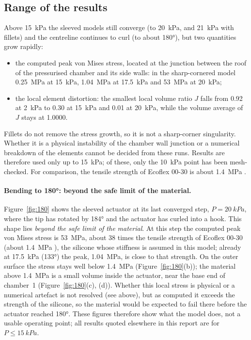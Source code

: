 \documentclass[12pt,a4paper,oneside]{report}
\numberwithin{equation}{chapter}
\numberwithin{figure}{chapter}
\numberwithin{table}{chapter}
\begin{document}
\subsection{Range of the results}\label{sec:limit}
Above \SI{15}{kPa} the sleeved models still converge (to \SI{20}{kPa}, and \SI{21}{kPa} with fillets) and the
centreline continues to curl (to about \ang{180}), but two quantities grow rapidly:
\begin{itemize}
\item the computed peak von Mises stress, located at the junction between the roof of the pressurised
chamber and its side walls: in the sharp-cornered model \SI{0.25}{MPa} at \SI{15}{kPa}, \SI{1.04}{MPa} at
\SI{17.5}{kPa} and \SI{53}{MPa} at \SI{20}{kPa};
\item the local element distortion: the smallest local volume ratio $J$ falls from 0.92 at \SI{2}{kPa} to 0.30
at \SI{15}{kPa} and 0.01 at \SI{20}{kPa}, while the volume average of $J$ stays at 1.0000.
\end{itemize}
Fillets do not remove the stress growth, so it is not a sharp-corner singularity. Whether it is a physical
instability of the chamber wall junction or a numerical breakdown of the elements cannot be decided from these
runs. Results are therefore used only up to \SI{15}{kPa}; of these, only the \SI{10}{kPa} point has been
mesh-checked. For comparison, the tensile strength of Ecoflex 00-30 is about \SI{1.4}{MPa} \cite{ecoflex}.

\paragraph{Bending to \ang{180}: beyond the safe limit of the material.} Figure~\ref{fig:180} shows the sleeved
actuator at its last converged step, $P=\SI{20}{kPa}$, where the tip has rotated by \ang{184} and the actuator
has curled into a hook. This shape lies \emph{beyond the safe limit of the material}. At this step the computed
peak von Mises stress is \SI{53}{MPa}, about 38 times the tensile strength of Ecoflex 00-30 (about
\SI{1.4}{MPa} \cite{ecoflex}), the silicone whose stiffness is assumed in this model; already at
\SI{17.5}{kPa} (\ang{133}) the peak, \SI{1.04}{MPa}, is close to that strength. On the outer surface the stress stays well below
\SI{1.4}{MPa} (Figure~\ref{fig:180}(b)); the material above \SI{1.4}{MPa} is a small volume inside the
actuator, near the base end of chamber~1 (Figure~\ref{fig:180}(c), (d)). Whether this local stress is physical
or a numerical artefact is not resolved (see above), but as computed it exceeds the strength of the silicone,
so the material would be expected to fail there before the actuator reached \ang{180}. These figures therefore show what the model does, not a usable operating point; all
results quoted elsewhere in this report are for $P\le\SI{15}{kPa}$.
\end{document}
